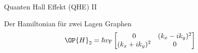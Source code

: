 \documentclass[../defence.tex]{subfiles}
\begin{document}
  \begin{frame}{Quanten Hall Effekt (QHE) II}
    \begin{block}{Der Hamiltonian für zwei Lagen Graphen}
      \begin{equation*}
        \OP{H}_{2}=\hbar v_\mathrm{F}
          \begin{bmatrix}
            0 & (k_x - ik_y)^2 \\
            (k_x+ ik_y)^2 & 0
          \end{bmatrix}
      \end{equation*}
    \end{block}
  \end{frame}
\end{document}
